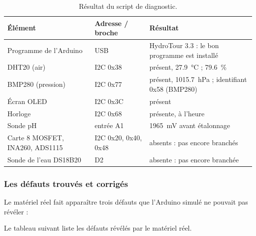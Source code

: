\begin{table}[H]
\centering
\small
\begin{tabularx}{\textwidth}{|l|l|Y|}
\hline
\textbf{Élément} & \textbf{Adresse / broche} & \textbf{Résultat} \\
\hline
Programme de l'Arduino & USB & HydroTour 3.3 : le bon programme est installé \\
\hline
DHT20 (air) & I2C 0x38 & présent, \qty{27,9}{\celsius} ; \qty{79,6}{\percent} \\
\hline
BMP280 (pression) & I2C 0x77 & présent, \qty{1015,7}{hPa} ; identifiant 0x58 (BMP280) \\
\hline
Écran OLED & I2C 0x3C & présent \\
\hline
Horloge & I2C 0x68 & présente, à l'heure \\
\hline
Sonde pH & entrée A1 & \qty{1965}{mV} avant étalonnage \\
\hline
Carte 8 MOSFET, INA260, ADS1115 & I2C 0x20, 0x40, 0x48 & absents : pas encore branchés \\
\hline
Sonde de l'eau DS18B20 & D2 & absente : pas encore branchée \\
\hline
\end{tabularx}
\caption{Résultat du script de diagnostic.}
\end{table}

\subsubsection*{Les défauts trouvés et corrigés}

Le matériel réel fait apparaître trois défauts que l'Arduino simulé ne pouvait pas révéler :

Le tableau suivant liste les défauts révélés par le matériel réel.


